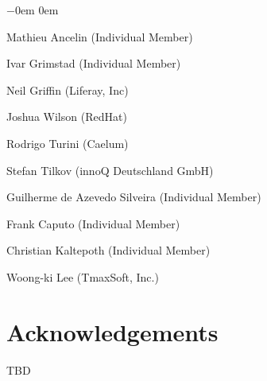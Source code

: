 \begin{list}{$-$}{\parsep 0em  0em}
\item Mathieu Ancelin (Individual Member)
\item Ivar Grimstad (Individual Member)
\item Neil Griffin (Liferay, Inc)
\item Joshua Wilson (RedHat)
\item Rodrigo Turini (Caelum)
\item Stefan Tilkov (innoQ Deutschland GmbH)
\item Guilherme de Azevedo Silveira (Individual Member)
\item Frank Caputo (Individual Member)
\item Christian Kaltepoth (Individual Member)
\item Woong-ki Lee (TmaxSoft, Inc.)
\end{list}

\section{Acknowledgements}
\label{acks}

TBD
